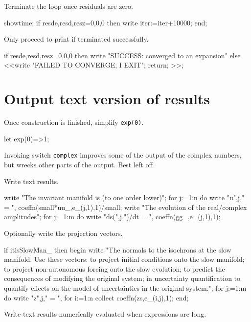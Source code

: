 \documentclass[11pt,a5paper]{article}
\begin{document}
Terminate the loop once residuals are zero.
\begin{reduce}
showtime;
if {resde,resd,resz}={0,0,0} then write iter:=iter+10000;
end;
\end{reduce}

Only proceed to print if terminated successfully.
\begin{reduce}
if {resde,resd,resz}={0,0,0} 
  then write "SUCCESS: converged to an expansion"
  else <<write "FAILED TO CONVERGE; I EXIT";
    return; >>;
\end{reduce}





\section{Output text version of results}

Once construction is finished, simplify \verb|exp(0)|.
\begin{reduce}
let exp(0)=>1;
\end{reduce}

Invoking switch \verb|complex| improves some of the output
of the complex numbers, but wrecks other parts of the
output.  Best left off.


Write text results.
\begin{reduce}
write "The invariant manifold is (to one order lower)";
for j:=1:n do write "u",j," = ",
  coeffn(small*uu_,e_(j,1),1)/small;
write "The evolution of the real/complex amplitudes";
for j:=1:m do write "ds(",j,")/dt = ",
  coeffn(gg_,e_(j,1),1);
\end{reduce}

Optionally write the projection vectors.
\begin{reduce}
if itisSlowMan_ then begin
  write "The normals to the isochrons at the slow manifold.
Use these vectors: to project initial conditions
onto the slow manifold; to project non-autonomous
forcing onto the slow evolution; to predict the
consequences of modifying the original system; in
uncertainty quantification to quantify effects on
the model of uncertainties in the original system.";
  for j:=1:m do write "z",j," = ",
    for i:=1:n collect coeffn(zs,e_(i,j),1);
end;
\end{reduce}

Write text results numerically evaluated when expressions
are long.
\end{document}
